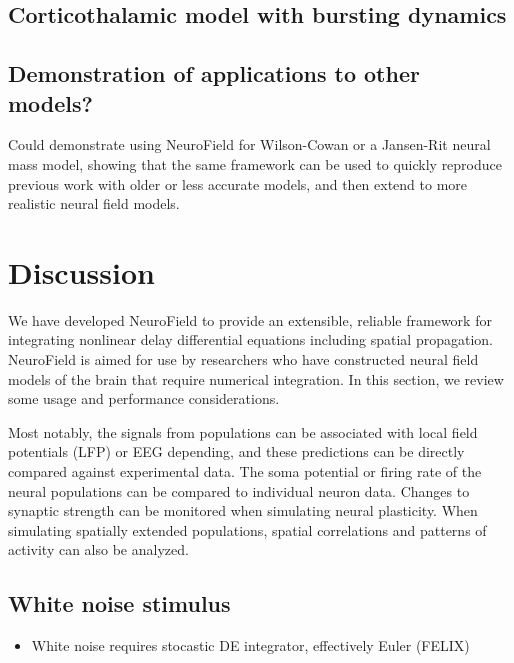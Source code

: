 \documentclass[preprint,review,10pt,authoryear,letterpaper]{elsarticle}
\begin{document}
\subsection{Corticothalamic model with bursting dynamics}
\label{sec:burst}


\subsection{Demonstration of applications to other models?}
Could demonstrate using NeuroField for Wilson-Cowan or a Jansen-Rit neural mass model, showing that the same framework can be used to quickly reproduce previous work with older or less accurate models, and then extend to more realistic neural field models. 

\section{Discussion}
\label{sec:discussion}

We have developed NeuroField to provide an extensible, reliable framework for integrating nonlinear delay differential equations including spatial propagation. NeuroField is aimed for use by researchers who have constructed neural field models of the brain that require numerical integration. In this section, we review some usage and performance considerations.

Most notably, the signals from populations can be associated with local field potentials (LFP) or EEG depending, and these predictions can be directly compared against experimental data. The soma potential or firing rate of the neural populations can be compared to individual neuron data. Changes to synaptic strength can be monitored when simulating neural plasticity. When simulating spatially extended populations, spatial correlations and patterns of activity can also be analyzed. 

\subsection{White noise stimulus}
\begin{itemize}
	\item White noise requires stocastic DE integrator, effectively Euler (FELIX)
\end{itemize}
\end{document}
